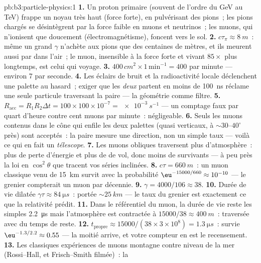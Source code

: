 \begin{solution}{pb:b3:particle-physics:1}
\textbf{1.} Un proton primaire (souvent de l'ordre du \unit{GeV} au
\unit{TeV}) frappe un noyau très haut (force forte), en pulvérisant
des pions~; les pions chargés se désintègrent par la force faible en
muons et neutrinos~; les muons, qui n'ionisent que doucement
(électromagnétisme), foncent vers le sol.
\textbf{2.} $c\tau_\pi \approx \qty{8}{m}$~: même un grand $\gamma$
n'achète aux pions que des centaines de mètres, et ils meurent aussi
par  dans l'air~; le muon, insensible à la force
forte et vivant $85\times$ plus longtemps, est celui qui voyage.
\textbf{3.} $400\,\unit{cm^2}\times1\,\text{min}^{-1} = 400$
par minute --- environ 7 par seconde.
\textbf{4.} Les éclairs de bruit et la radioactivité locale
déclenchent une palette au hasard~; exiger que les \emph{deux}
partent en moins de \qty{100}{ns} réclame une seule particule
traversant la paire --- la géométrie comme filtre.
\textbf{5.} $R_{\text{acc}} = R_1R_2\Delta t = 100\times100
\times10^{-7} = \qty{e-3}{s^{-1}}$ --- un comptage faux par quart
d'heure contre cent muons par minute~: négligeable.
\textbf{6.} Seuls les muons contenus dans le cône qui enfile les
deux palettes (quasi verticaux, à ${\sim}30$--$40^\circ$ près) sont
acceptés~: la paire mesure une direction, non un simple taux ---
voilà ce qui en fait un \emph{télescope}.
\textbf{7.} Les muons obliques traversent plus d'atmosphère~: plus de
perte d'énergie et plus de  de vol, donc moins de
survivants --- à peu près la loi en $\cos^2\theta$ que tracent vos
séries inclinées.
\textbf{8.} $c\tau = \qty{660}{m}$~: un muon classique venu de
\qty{15}{km} survit avec la probabilité
$\eu^{-15000/660} \approx 10^{-10}$ --- le grenier compterait un
muon par décennie.
\textbf{9.} $\gamma = 4000/106 \approx 38$.
\textbf{10.} Durée de vie dilatée $\gamma\tau \approx
\qty{84}{\micro s}$~: portée ${\sim}\qty{25}{km}$ --- le taux du
grenier est exactement ce que la relativité prédit.
\textbf{11.} Dans le référentiel du muon, la durée de vie reste les
simples \qty{2.2}{\micro s} mais l'atmosphère est contractée à
$15000/38 \approx \qty{400}{m}$~: traversée avec du temps de reste.
\textbf{12.} $t_{\text{propre}} \approx 15000/(38\times3\times
10^8) = \qty{1.3}{\micro s}$~: survie $\eu^{-1.3/2.2} \approx
0.55$ --- la moitié arrive, et votre compteur en est le
recensement.
\textbf{13.} Les classiques expériences de muons montagne contre
niveau de la mer (Rossi--Hall, et Frisch--Smith filmée)~: la

\end{solution}
